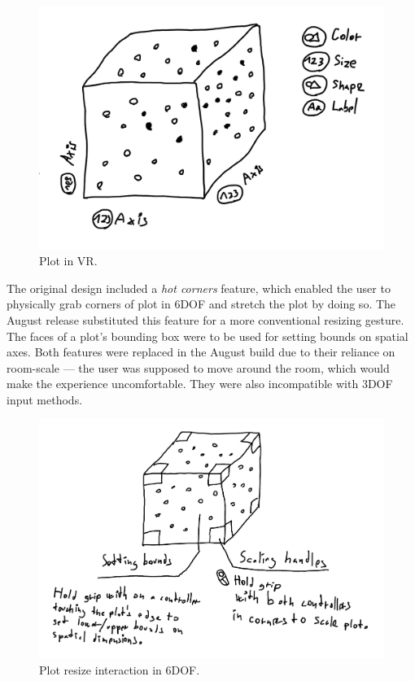 \documentclass[thesis=M,english,hidelinks]{FITthesisXE}[2012/06/26]
\begin{document}
\newpage

\begin{figure}[ht]
\centering
\includegraphics[scale=1]{sketch_plot}
\caption{Plot in VR.}
\label{fig:sketch_plot}
\end{figure}

The original design included a \emph{hot corners} feature, which enabled the user to physically grab corners of plot in 6DOF and stretch the plot by doing so. The August release substituted this feature for a more conventional resizing gesture. The faces of a plot's bounding box were to be used for setting bounds on spatial axes. Both features were replaced in the August build due to their reliance on room-scale --- the user was supposed to move around the room, which would make the experience uncomfortable. They were also incompatible with 3DOF input methods.

\begin{figure}[ht]
\centering
\includegraphics[scale=0.85]{sketch_6dofresize}
\caption{Plot resize interaction in 6DOF.}
\label{fig:sketch_6dofresize}
\end{figure}
\end{document}
